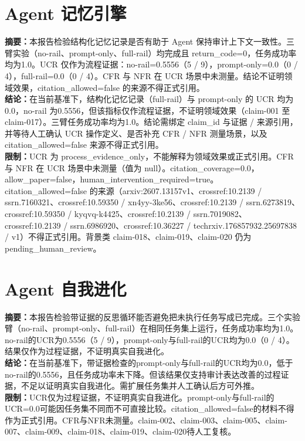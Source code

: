 \documentclass[UTF8]{ctexart}
\begin{document}
\section{Agent 记忆引擎}
\textbf{摘要：}本报告检验结构化记忆记录是否有助于 Agent 保持审计上下文一致性。三臂实验（no-\allowbreak{}rail、prompt-\allowbreak{}only、full-\allowbreak{}rail）均完成且 return\_\allowbreak{}code=0，任务成功率均为1.0。UCR 仅作为流程证据：no-\allowbreak{}rail=0.5556（5 / 9），prompt-\allowbreak{}only=0.0（0 / 4），full-\allowbreak{}rail=0.0（0 / 4）。CFR 与 NFR 在 UCR 场景中未测量。结论不证明领域效果，citation\_\allowbreak{}allowed=false 的来源不得正式引用。\\
\textbf{结论：}在当前基准下，结构化记忆记录（full-\allowbreak{}rail）与 prompt-\allowbreak{}only 的 UCR 均为0.0，no-\allowbreak{}rail 为0.5556，但该指标仅作流程证据，不证明领域效果（claim-\allowbreak{}001 至 claim-\allowbreak{}017）。三臂任务成功率均为1.0。结论需绑定 claim\_\allowbreak{}id 与证据 / 来源引用，并等待人工确认 UCR 操作定义、是否补充 CFR / NFR 测量场景，以及 citation\_\allowbreak{}allowed=false 来源不得正式引用。\\
\textbf{限制：}UCR 为 process\_\allowbreak{}evidence\_\allowbreak{}only，不能解释为领域效果或正式引用。CFR 与 NFR 在 UCR 场景中未测量（值为 null）。citation\_\allowbreak{}coverage=0.0，allow\_\allowbreak{}paper=false，human\_\allowbreak{}intervention\_\allowbreak{}required=true。citation\_\allowbreak{}allowed=false 的来源（arxiv:2607.13157v1、crossref:10.2139 / ssrn.7160321、crossref:10.59350 / xn4yy-\allowbreak{}3ke56、crossref:10.2139 / ssrn.6273819、crossref:10.59350 / kyqvq-\allowbreak{}k4425、crossref:10.2139 / ssrn.7019082、crossref:10.2139 / ssrn.6986920、crossref:10.36227 / techrxiv.176857932.25697838 / v1）不得正式引用。背景类 claim-\allowbreak{}018、claim-\allowbreak{}019、claim-\allowbreak{}020 仍为 pending\_\allowbreak{}human\_\allowbreak{}review。
\section{Agent 自我进化}
\textbf{摘要：}本报告检验带证据的反思循环能否避免把未执行任务写成已完成。三个实验臂（no-\allowbreak{}rail、prompt-\allowbreak{}only、full-\allowbreak{}rail）在相同任务集上运行，任务成功率均为1.0。no-\allowbreak{}rail的UCR为0.5556（5 / 9），prompt-\allowbreak{}only与full-\allowbreak{}rail的UCR均为0.0（0 / 4）。结果仅作为过程证据，不证明真实自我进化。\\
\textbf{结论：}在当前基准下，带证据检查的prompt-\allowbreak{}only与full-\allowbreak{}rail的UCR均为0.0，低于no-\allowbreak{}rail的0.5556，且任务成功率未下降。但该结果仅支持审计表达改善的过程证据，不足以证明真实自我进化。需扩展任务集并人工确认后方可外推。\\
\textbf{限制：}UCR仅为过程证据，不证明真实自我进化。prompt-\allowbreak{}only与full-\allowbreak{}rail的UCR=0.0可能因任务集不同而不可直接比较。citation\_\allowbreak{}allowed=false的材料不得作为正式引用。CFR与NFR未测量。claim-\allowbreak{}002、claim-\allowbreak{}003、claim-\allowbreak{}005、claim-\allowbreak{}007、claim-\allowbreak{}009、claim-\allowbreak{}018、claim-\allowbreak{}019、claim-\allowbreak{}020待人工复核。
\end{document}
